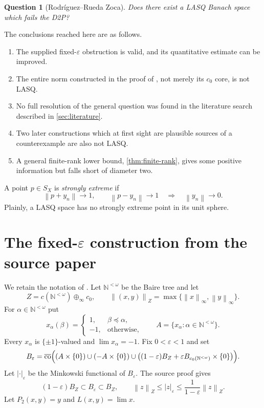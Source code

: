 \documentclass[11pt]{article}
\newtheorem{question}[theorem]{Question}
\newcommand{\N}{\mathbb N}
\newcommand{\eps}{\varepsilon}
\newcommand{\clco}{\overline{\operatorname{co}}}
\newcommand{\norm}[1]{\left\lVert #1\right\rVert}
\newcommand{\sourceNorm}[1]{\left\lvert #1\right\rvert_{\eps}}
\begin{document}
\begin{question}[Rodr\'iguez--Rueda Zoca]
Does there exist a LASQ Banach space which fails the D2P?
\end{question}

The conclusions reached here are as follows.
\begin{enumerate}
\item The supplied fixed-$\eps$ obstruction is valid, and its quantitative estimate can be improved.
\item The entire norm constructed in the proof of \cite[Theorem~1.2]{RodriguezRueda2023}, not merely its $c_0$ core, is not LASQ.
\item No full resolution of the general question was found in the literature search described in \cref{sec:literature}.
\item Two later constructions which at first sight are plausible sources of a counterexample are also not LASQ.
\item A general finite-rank lower bound, \cref{thm:finite-rank}, gives some positive information but falls short of diameter two.
\end{enumerate}

A point $p\in S_X$ is \emph{strongly extreme} if
\[
 \norm{p+y_n}\longrightarrow 1,
 \qquad
 \norm{p-y_n}\longrightarrow 1
 \quad\Longrightarrow\quad
 \norm{y_n}\longrightarrow 0.
\]
Plainly, a LASQ space has no strongly extreme point in its unit sphere.

\section{The fixed-$\eps$ construction from the source paper}
\label{sec:source}

We retain the notation of \cite[Section~3]{RodriguezRueda2023}.  Let $\N^{<\omega}$ be the Baire tree and let
\[
 Z=c(\N^{<\omega})\oplus_\infty c_0,
 \qquad
 \norm{(x,y)}_Z=\max\{\norm{x}_\infty,\norm{y}_\infty\}.
\]
For $\alpha\in\N^{<\omega}$ put
\[
 x_\alpha(\beta)=
 \begin{cases}
  1,&\beta\preceq\alpha,\\
 -1,&\text{otherwise},
 \end{cases}
 \qquad
 A=\{x_\alpha:\alpha\in\N^{<\omega}\}.
\]
Every $x_\alpha$ is $\{\pm1\}$-valued and $\lim x_\alpha=-1$.  Fix $0<\eps<1$ and set
\begin{equation}
\label{eq:source-ball}
 B_\eps=\clco\Bigl(
 (A\times\{0\})\cup(-A\times\{0\})\cup
 \bigl((1-\eps)B_Z+\eps B_{c_0(\N^{<\omega})}\times\{0\}\bigr)
 \Bigr).
\end{equation}
Let $\sourceNorm{\cdot}$ be the Minkowski functional of $B_\eps$.  The source proof gives
\begin{equation}
\label{eq:norm-comparison}
 (1-\eps)B_Z\subset B_\eps\subset B_Z,
 \qquad
 \norm{z}_Z\le\sourceNorm{z}\le\frac{1}{1-\eps}\norm{z}_Z.
\end{equation}
Let $P_2(x,y)=y$ and $L(x,y)=\lim x$.
\end{document}
